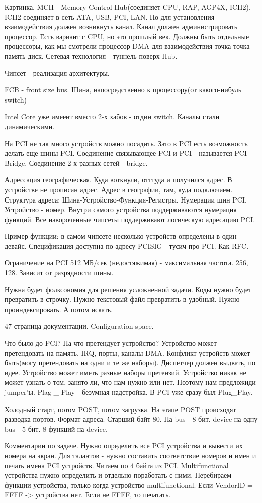 Картинка.
MCH - Memory Control Hub(соединяет CPU, RAP, AGP4X, ICH2). ICH2 соединяет в сеть ATA, USB, PCI, LAN. Но для установления взаимодействия должен возникнуть канал. Канал должен администрировать процессор. Есть вариант с CPU, но это прошлый век. Должны быть отдельные процессоры, как мы смотрели процессор DMA для взаимодействия точка-точка память-диск. Сетевая технология - туннель поверх Hub.

Чипсет - реализация архитектуры. 

\begin{defn}FCB - front size bus. Шина, напосредственно к процессору(от какого-нибуль switch)\end{defn}

Intel Core уже имеент вместо 2-х хабов - отдин switch. Каналы стали динамическими. 

На PCI не так много устройств можно посадить. Зато в PCI есть возможность делать еще шины PCI. Соединение связывающее PCI и PCI - называется PCI Bridge. Соединение 2-х разных сетей - bridge.

Адрессация географическая. Куда воткнули, отттуда и получился адрес. В устройстве не прописан адрес. Адрес в географии, там, куда подключаем. Структура адреса: Шина-Устройство-Функция-Регистры. Нумерации шин PCI. Устройство - номер. Внутри самого устройства поддерживаются нумерация функций. Все навороченные чипсеты поддерживают логическую адресацию PCI. 

Пример функции: в самом чипсете несколько устройств определены в один девайс. Спецификация доступна по адресу PCISIG - тусич про PCI. Как RFC.

Ограничение на PCI 512 МБ/сек (недостяжимая) - максимальная частота. 256, 128. Зависит от разрядности шины.

Нужна будет фолксономия для решения усложненной задачи. Коды нужно будет превратить в строчку. Нужно текстовый файл превратить в удобный. Нужно проиндексировать.  А потом искать.

47 страница документации. Configuration space.

Что было до PCI? На что претендует устройство? Устройство может претендовать на память, IRQ, порты, каналы DMA. Конфликт устройств может быть(могу претендовать на одни и те же наборы). Диспетчер должен выдвать, по идее. Устройство может иметь разные наборы претензий. Устройство никак не может узнать о том, занято ли, что нам нужно или нет. Поэтому нам предложиди jumper'ы.
Plag \_ Play - безумная надстройка. В PCI уже сразу был Plug\_Play.  

Холодный старт, потом POST, потом загрузка. На этапе POST происходят разводка портов. Формат адреса. Старший байт 80. На bus - 8 бит. device на одну bus - 5 бит. 8 функций на device.

\begin{hw}Комментарии по задаче. Нужно определить все PCI устройства и вывести их номера на экран. Для талантов - нужно составить соответствие номеров и имен и печать имена PCI устройств. 
Читаем по 4 байта из PCI. Multifunctional устройства нужно определить и отдельно поработать с ними. Перебираем функции устройства, только когда устройство multifunctional. Если VendorID = FFFF -> устройства нет. Если не FFFF, то печатать.
\end{hw}
    